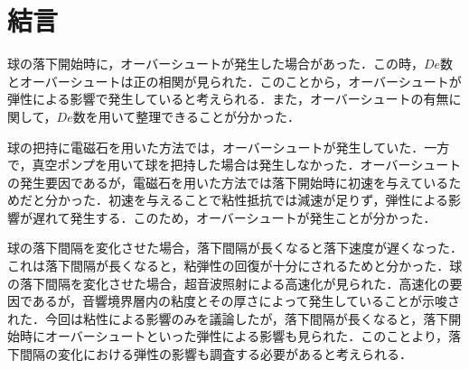 \clearpage
\section{結言}
球の落下開始時に，オーバーシュートが発生した場合があった．この時，$De$数とオーバーシュートは正の相関が見られた．このことから，オーバーシュートが弾性による影響で発生していると考えられる．また，オーバーシュートの有無に関して，$De$数を用いて整理できることが分かった．

球の把持に電磁石を用いた方法では，オーバーシュートが発生していた．一方で，真空ポンプを用いて球を把持した場合は発生しなかった．オーバーシュートの発生要因であるが，電磁石を用いた方法では落下開始時に初速を与えているためだと分かった．初速を与えることで粘性抵抗では減速が足りず，弾性による影響が遅れて発生する．このため，オーバーシュートが発生ことが分かった．

球の落下間隔を変化させた場合，落下間隔が長くなると落下速度が遅くなった．これは落下間隔が長くなると，粘弾性の回復が十分にされるためと分かった．球の落下間隔を変化させた場合，超音波照射による高速化が見られた．高速化の要因であるが，音響境界層内の粘度とその厚さによって発生していることが示唆された．今回は粘性による影響のみを議論したが，落下間隔が長くなると，落下開始時にオーバーシュートといった弾性による影響も見られた．このことより，落下間隔の変化における弾性の影響も調査する必要があると考えられる．

